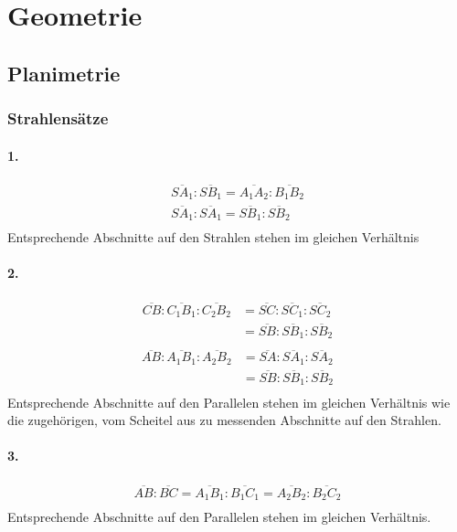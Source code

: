 \section{Geometrie}
\subsection{Planimetrie}
\subsubsection{Strahlensätze}
\paragraph{1.}
\begin{align*}
    \overline{SA_1} : \overline{SB_1} = \overline{A_1A_2} : \overline{B_1B_2} \\
    \overline{SA_1} : \overline{SA_1} = \overline{SB_1} : \overline{SB_2} \\
\end{align*}
Entsprechende Abschnitte auf den Strahlen stehen im gleichen Verhältnis

\paragraph{2.}
\begin{align*}
    \overline{CB} : \overline{C_1B_1}: \overline{C_2B_2}    &= \overline{SC} : \overline{SC_1} : \overline{SC_2}  \\
                                                            &= \overline{SB} : \overline{SB_1} : \overline{SB_2}  \\
\end{align*}
\begin{align*}
    \overline{AB} : \overline{A_1B_1}: \overline{A_2B_2}    &= \overline{SA} : \overline{SA_1} : \overline{SA_2}  \\
                                                            &= \overline{SB} : \overline{SB_1} : \overline{SB_2}  \\
\end{align*}
Entsprechende Abschnitte auf den Parallelen stehen im gleichen Verhältnis wie die zugehörigen, vom Scheitel aus zu messenden Abschnitte auf den Strahlen.

\paragraph{3.}
\begin{align*}
    \overline{AB} : \overline{BC} = \overline{A_1B_1} : \overline{B_1C_1} = \overline{A_2B_2} : \overline{B_2C_2} \\
\end{align*}
Entsprechende Abschnitte auf den Parallelen stehen im gleichen Verhältnis.

